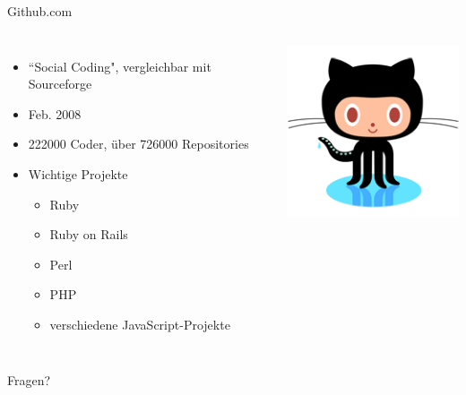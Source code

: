 \documentclass{beamer}
\begin{document}
\begin{frame}{Github.com}
\begin{columns}
    \begin{itemize}
    \item ``Social Coding", vergleichbar mit Sourceforge
	\item Feb. 2008
	\item 222000 Coder, über 726000 Repositories
	\item Wichtige Projekte
	\begin{itemize}
	  \item Ruby
	  \item Ruby on Rails
	  \item Perl
	  \item PHP
	  \item verschiedene JavaScript-Projekte
	\end{itemize}
  \end{itemize}
	\includegraphics[scale=2]{./images/octocat.png}
  \end{columns}
\end{frame}

\begin{frame}
  \Huge{Fragen?}
\end{frame}
\end{document}
